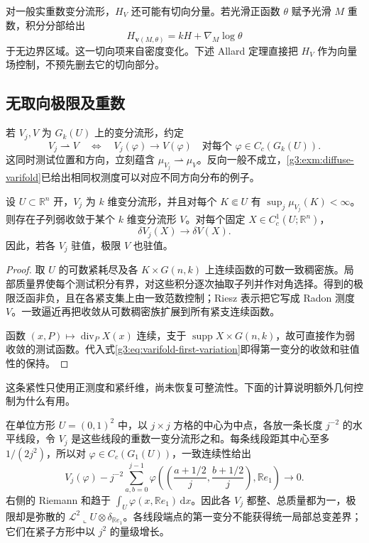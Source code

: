 对一般实重数变分流形，\(H_V\) 还可能有切向分量。若光滑正函数 \(\theta\) 赋予光滑 \(M\) 重数，积分分部给出
\[
	H_{\mathbf v(M,\theta)}=kH+\nabla_M\log\theta
\]
于无边界区域。这一切向项来自密度变化。下述 Allard 定理直接把 \(H_V\) 作为向量场控制，不预先删去它的切向部分。

\subsection{无取向极限及重数}
\label{g3:subsec:2304:03}
若 \(V_j,V\) 为 \(G_k(U)\) 上的变分流形，约定
\[
	V_j\rightharpoonup V
	\quad\Longleftrightarrow\quad
	V_j(\varphi)\longrightarrow V(\varphi)
	\quad\text{对每个 }\varphi\in C_c(G_k(U)).
\]
这同时测试位置和方向，立刻蕴含 \(\mu_{V_j}\rightharpoonup\mu_V\)。反向一般不成立，\cref{g3:exm:diffuse-varifold}已给出相同权测度可以对应不同方向分布的例子。

\begin{proposition}\label{g3:prop:varifold-weak-compactness}
	设 \(U\subset\mathbb R^n\) 开，\(V_j\) 为 \(k\) 维变分流形，并且对每个 \(K\Subset U\) 有 \(\sup_j\mu_{V_j}(K)<\infty\)。则存在子列弱收敛于某个 \(k\) 维变分流形 \(V\)。对每个固定 \(X\in C_c^1(U;\mathbb R^n)\)，
	\[
		\delta V_j(X)\longrightarrow\delta V(X).
	\]
	因此，若各 \(V_j\) 驻值，极限 \(V\) 也驻值。
\end{proposition}
\begin{proof}
	取 \(U\) 的可数紧耗尽及各 \(K\times G(n,k)\) 上连续函数的可数一致稠密族。局部质量界使每个测试积分有界，对这些积分逐次抽取子列并作对角选择。得到的极限泛函非负，且在各紧支集上由一致范数控制；Riesz 表示把它写成 Radon 测度 \(V\)。一致逼近再把收敛从可数稠密族扩展到所有紧支连续函数。

	函数 \((x,P)\mapsto\operatorname{div}_PX(x)\) 连续，支于 \(\operatorname{supp}X\times G(n,k)\)，故可直接作为弱收敛的测试函数。代入式\eqref{g3:eq:varifold-first-variation}即得第一变分的收敛和驻值性的保持。
\end{proof}

这条紧性只使用正测度和紧纤维，尚未恢复可整流性。下面的计算说明额外几何控制为什么有用。

\begin{example}\label{g3:exm:varifold-diffuse-limit}
	在单位方形 \(U=(0,1)^2\) 中，以 \(j\times j\) 方格的中心为中点，各放一条长度 \(j^{-2}\) 的水平线段，令 \(V_j\) 是这些线段的重数一变分流形之和。每条线段距其中心至多 \(1/(2j^2)\)，所以对 \(\varphi\in C_c(G_1(U))\)，一致连续性给出
	\[
		V_j(\varphi)-j^{-2}\sum_{a,b=0}^{j-1}
		\varphi\left(\left(\frac{a+1/2}{j},\frac{b+1/2}{j}\right),\mathbb Re_1\right)
		\longrightarrow0.
	\]
	右侧的 Riemann 和趋于 \(\int_U\varphi(x,\mathbb Re_1)\,\mathrm dx\)。因此各 \(V_j\) 都整、总质量都为一，极限却是弥散的 \(\mathcal L^2\llcorner U\otimes\delta_{\mathbb Re_1}\)。各线段端点的第一变分不能获得统一局部总变差界；它们在紧子方形中以 \(j^2\) 的量级增长。
\end{example}

